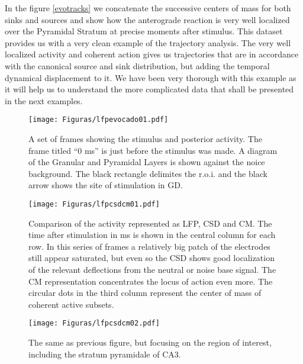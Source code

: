 \documentclass[12pt, letterpaper]{article}
\begin{document}
In the figure \ref{evotracks} we concatenate the successive centers of mass
for both sinks and sources and show how the anterograde reaction is
very well localized over the Pyramidal Stratum at precise moments after
stimulus. This dataset provides us with a very clean example of the
trajectory analysis. The very well localized activity and coherent
action gives us trajectories that are in accordance with the canonical
source and sink distribution, but adding the temporal dynamical displacement
to it. We have been very thorough with this example as it will help us
to understand the more complicated data that shall be presented in
the next examples. 



\begin{figure}
  \texttt{[image: Figuras/lfpevocado01.pdf]}
  \caption{A set of frames showing the stimulus and posterior activity.
    The frame titled ``0 ms'' is just before the stimulus was
    made.  A diagram of the Granular and Pyramidal Layers is shown
    against the noice background. The black rectangle delimites the
    r.o.i. and the black arrow shows the site of stimulation in GD.
  }\label{lfpevocada}
\end{figure}

\begin{figure}[h]
\texttt{[image: Figuras/lfpcsdcm01.pdf]}
\caption{ Comparison of the activity represented as LFP, CSD and CM.
  The time after
  stimulation in ms is shown in the central column for each row.
  In this series of frames a relatively big patch of the electrodes
  still appear saturated, but even so the CSD shows good localization
  of the relevant deflections from the neutral or noise base signal.
  The CM representation concentrates the locus of action even more.
  The circular dots in the third column represent the center of mass
  of coherent active subsets.
}\label{lfpcsdcm}
\end{figure}



\begin{figure}[h]
\texttt{[image: Figuras/lfpcsdcm02.pdf]}
\caption{ The same as previous figure, but focusing on the
  region of interest, including the stratum pyramidale of CA3.
}\label{lfpcsdcmsub}
\end{figure}
\end{document}
